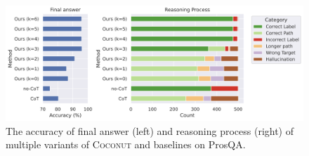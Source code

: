\documentclass[]{fairmeta}
\newcommand{\ours}{\textsc{Coconut}\xspace}
\begin{document}
\begin{figure}
    \centering
    \includegraphics[width=\linewidth]{figures/figure_5_revised_1111.png}
    \caption{The accuracy of final answer (left) and reasoning process (right) of multiple variants of \ours and baselines on ProsQA.}
    \label{fig:analysis}
\end{figure}
\end{document}
